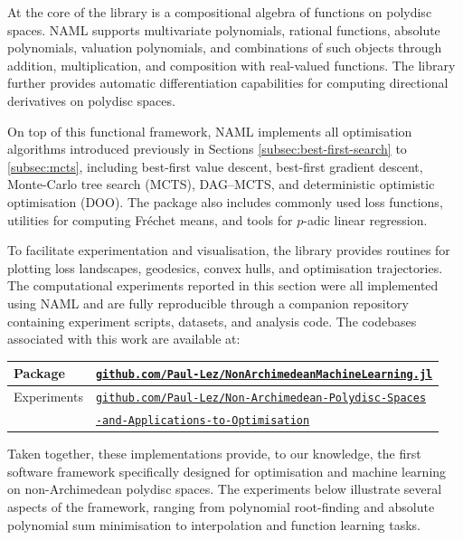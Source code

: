 \documentclass[10pt]{article}
\theoremstyle{definition}
\begin{document}
At the core of the library is a compositional algebra of functions on polydisc spaces. NAML supports multivariate polynomials, rational functions, absolute polynomials, valuation polynomials, and combinations of such objects through addition, multiplication, and composition with real-valued functions. The library further provides automatic differentiation capabilities for computing directional derivatives on polydisc spaces.

On top of this functional framework, NAML implements all optimisation algorithms introduced previously in Sections \ref{subsec:best-first-search} to \ref{subsec:mcts}, including best-first value descent, best-first gradient descent, Monte-Carlo tree search (MCTS), DAG--MCTS, and deterministic optimistic optimisation (DOO). The package also includes commonly used loss functions, utilities for computing Fr\'echet means, and tools for $p$-adic linear regression.

To facilitate experimentation and visualisation, the library provides routines for plotting loss landscapes, geodesics, convex hulls, and optimisation trajectories. The computational experiments reported in this section were all implemented using NAML and are fully reproducible through a companion repository containing experiment scripts, datasets, and analysis code.
The codebases associated with this work are available at:

\begin{center}
    \begin{tabular}{|l|l|}
        \hline
        Package & \href{https://github.com/Paul-Lez/NonArchimedeanMachineLearning.jl}{\texttt{github.com/Paul-Lez/NonArchimedeanMachineLearning.jl}} \\
        \hline
        Experiments & \href{https://github.com/Paul-Lez/Non-Archimedean-Polydisc-Spaces-and-Applications-to-Optimisation}{\texttt{github.com/Paul-Lez/Non-Archimedean-Polydisc-Spaces}} \\
        & \hspace{22mm}\href{https://github.com/Paul-Lez/Non-Archimedean-Polydisc-Spaces-and-Applications-to-Optimisation}{\texttt{-and-Applications-to-Optimisation}}\\
        \hline
    \end{tabular}
\end{center}

Taken together, these implementations provide, to our knowledge, the first software framework specifically designed for optimisation and machine learning on non-Archimedean polydisc spaces. The experiments below illustrate several aspects of the framework, ranging from polynomial root-finding and absolute polynomial sum minimisation to interpolation and function learning tasks.
\end{document}
